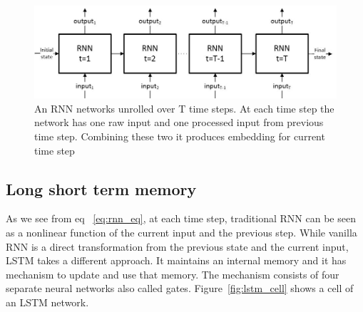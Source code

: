\documentclass[10pt,twocolumn,letterpaper]{article}
\begin{document}
\begin{figure}
	\begin{center}
		\includegraphics[width=\linewidth]{rnn_network}
	\end{center}
	\caption{An RNN networks unrolled over T time steps. At each time step the network has one raw input and one processed input from previous time step. Combining these two it produces embedding for current time step}
	\label{fig:rnn_network}
\end{figure}

\subsection{Long short term memory} \label{lstm_sec}
As we see from eq  ~\ref{eq:rnn_eq}, at each time step, traditional RNN can be seen as a nonlinear function of the current input and the previous step. While vanilla RNN is a direct transformation from the previous state and the current input, LSTM takes a different approach. It maintains an internal memory and it has mechanism to update and use that memory. The mechanism consists of four separate neural networks also called gates. Figure~\ref{fig:lstm_cell} shows a cell of an LSTM network. 
\end{document}
